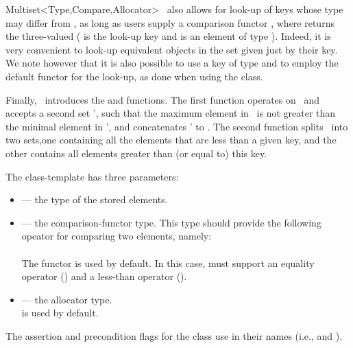 \begin{ccRefClass}{Multiset<Type,Compare,Allocator>}
\ccRefName\ also allows for look-up of keys whose type may differ from
, as long as users supply a comparison functor ,
where  returns the three-valued
 ( is the look-up key and  is an
element of type ). Indeed, it is very convenient to look-up
equivalent objects in the set given just by their key. We note however that
it is also possible to use a key of type  and to employ the default
 functor for the look-up, as done when using the
 class.

\begin{ccAdvanced}

Finally, \ccRefName\ introduces the  and 
functions. The first function operates on \ccVar\ and accepts a second
set \ccVar', such that the maximum element in \ccVar\ is not greater than
the minimal element in \ccVar', and concatenates \ccVar' to \ccVar. The
second function splits \ccVar\ into two sets,one containing all the
elements that are less than a given key, and the other contains all
elements greater than (or equal to) this key.

\end{ccAdvanced}

\ccParameters

The  class-template has three parameters:
\begin{itemize}
\item {} --- the type of the stored elements.
\item {} --- the comparison-functor type. This type should provide
    the following opeator for comparing two  elements, namely: \\
  \\
    The  functor is used by default. In this case,
     must support an equality operator () and a
    less-than operator ().
\item {} --- the allocator type. \\
     is used by default.
\end{itemize}



The assertion and precondition flags for the  class
use  in their names (i.e.,  and
).


\end{ccRefClass}
